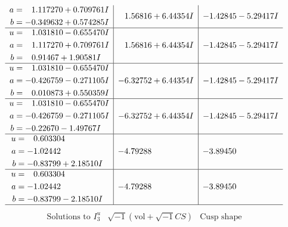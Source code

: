 \documentclass[1p]{elsarticle_modified}
\theoremstyle{definition}
\newcommand{\I}{\sqrt{-1}}
\begin{document}
$$\begin{array}{c|c|c}
\begin{aligned}
a &= \phantom{-}1.117270 + 0.709761 I \\
b &= -0.349632 + 0.574285 I\end{aligned}
 & \phantom{-}1.56816 + 6.44354 I & -1.42845 - 5.29417 I \\ \hline\begin{aligned}
u &= \phantom{-}1.031810 - 0.655470 I \\
a &= \phantom{-}1.117270 + 0.709761 I \\
b &= \phantom{-}0.91467 + 1.90581 I\end{aligned}
 & \phantom{-}1.56816 + 6.44354 I & -1.42845 - 5.29417 I \\ \hline\begin{aligned}
u &= \phantom{-}1.031810 - 0.655470 I \\
a &= -0.426759 - 0.271105 I \\
b &= \phantom{-}0.010873 + 0.550359 I\end{aligned}
 & -6.32752 + 6.44354 I & -1.42845 - 5.29417 I \\ \hline\begin{aligned}
u &= \phantom{-}1.031810 - 0.655470 I \\
a &= -0.426759 - 0.271105 I \\
b &= -0.22670 - 1.49767 I\end{aligned}
 & -6.32752 + 6.44354 I & -1.42845 - 5.29417 I \\ \hline\begin{aligned}
u &= \phantom{-}0.603304\phantom{ +0.000000I} \\
a &= -1.02442\phantom{ +0.000000I} \\
b &= -0.83799 + 2.18510 I\end{aligned}
 & -4.79288\phantom{ +0.000000I} & -3.89450\phantom{ +0.000000I} \\ \hline\begin{aligned}
u &= \phantom{-}0.603304\phantom{ +0.000000I} \\
a &= -1.02442\phantom{ +0.000000I} \\
b &= -0.83799 - 2.18510 I\end{aligned}
 & -4.79288\phantom{ +0.000000I} & -3.89450\phantom{ +0.000000I}\\
 \hline 
 \end{array}$$\newpage$$\begin{array}{c|c|c}  
\text{Solutions to }I^u_{3}& \I (\text{vol} + \sqrt{-1}CS) & \text{Cusp shape}\\
 \hline 
\begin{aligned}

\end{aligned}
\end{array}$$
\end{document}
